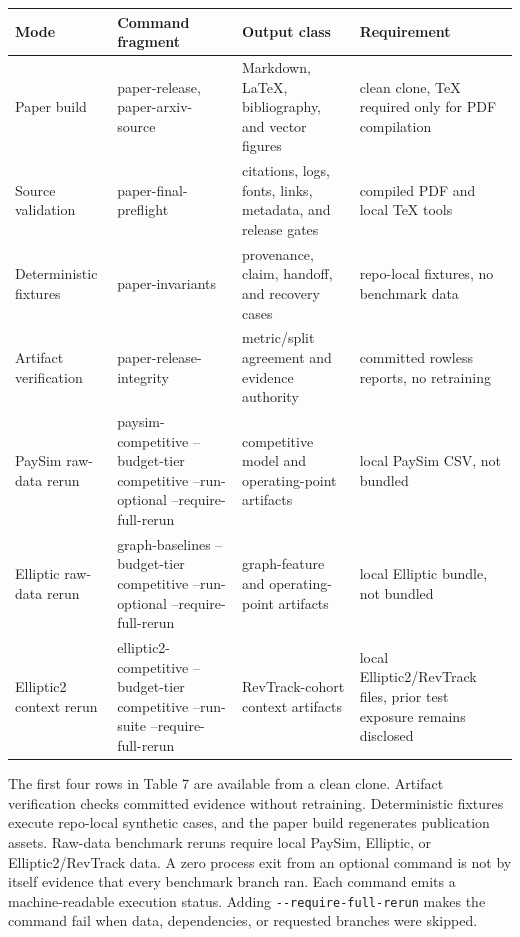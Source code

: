 \documentclass[11pt]{article}
\begin{document}
\begin{center}
\begin{minipage}{\linewidth}
\small
\setlength{\tabcolsep}{3pt}
\renewcommand{\arraystretch}{1.16}
\begin{tabularx}{\linewidth}{@{}>{\raggedright\arraybackslash}X >{\raggedright\arraybackslash}X >{\raggedright\arraybackslash}X >{\raggedright\arraybackslash}X@{}}
\toprule
Mode & Command fragment & Output class & Requirement \\
\midrule
Paper build & paper-release, paper-arxiv-source & Markdown, LaTeX, bibliography, and vector figures & clean clone, TeX required only for PDF compilation \\
Source validation & paper-final-preflight & citations, logs, fonts, links, metadata, and release gates & compiled PDF and local TeX tools \\
Deterministic fixtures & paper-invariants & provenance, claim, handoff, and recovery cases & repo-local fixtures, no benchmark data \\
Artifact verification & paper-release-integrity & metric/split agreement and evidence authority & committed rowless reports, no retraining \\
PaySim raw-data rerun & paysim-competitive --budget-tier competitive --run-optional --require-full-rerun & competitive model and operating-point artifacts & local PaySim CSV, not bundled \\
Elliptic raw-data rerun & graph-baselines --budget-tier competitive --run-optional --require-full-rerun & graph-feature and operating-point artifacts & local Elliptic bundle, not bundled \\
Elliptic2 context rerun & elliptic2-competitive --budget-tier competitive --run-suite --require-full-rerun & RevTrack-cohort context artifacts & local Elliptic2/RevTrack files, prior test exposure remains disclosed \\
\bottomrule
\end{tabularx}
\end{minipage}
\end{center}


The first four rows in Table 7 are available from a clean clone. Artifact verification checks committed evidence without retraining. Deterministic fixtures execute repo-local synthetic cases, and the paper build regenerates publication assets. Raw-data benchmark reruns require local PaySim, Elliptic, or Elliptic2/RevTrack data. A zero process exit from an optional command is not by itself evidence that every benchmark branch ran. Each command emits a machine-readable execution status. Adding \nolinkurl{--require-full-rerun} makes the command fail when data, dependencies, or requested branches were skipped.
\end{document}
